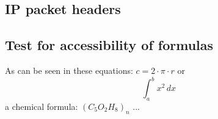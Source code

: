 
\subsection{IP packet headers}
\label{sec:ipheaders}

%
%

%
%

\subsection{Test for accessibility of formulas}

As can be seen in these equations:
$c=2 \cdot \pi \cdot r$ or \[ \int_{a}^{b} x^2 \,dx \] a chemical formula: $(C_5O_2H_8)_n$
...